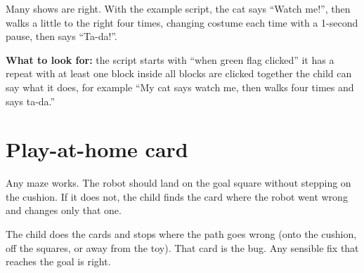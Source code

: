 \begin{answer}
Many shows are right. With the example script, the cat says \enquote{Watch me!}, then walks a little to the right four times, changing costume each time with a 1-second pause, then says \enquote{Ta-da!}.

\textbf{What to look for:} \tickbox{} the script starts with \enquote{when green flag clicked} \quad \tickbox{} it has a repeat with at least one block inside \quad \tickbox{} all blocks are clicked together \quad \tickbox{} the child can say what it does, for example \enquote{My cat says watch me, then walks four times and says ta-da.}
\end{answer}

\section{Play-at-home card}
\begin{answer}
Any maze works. The robot should land on the goal square without stepping on the cushion. If it does not, the child finds the card where the robot went wrong and changes only that one.
\end{answer}

\begin{answer}
The child does the cards and stops where the path goes wrong (onto the cushion, off the squares, or away from the toy). That card is the bug. Any sensible fix that reaches the goal is right.
\end{answer}

